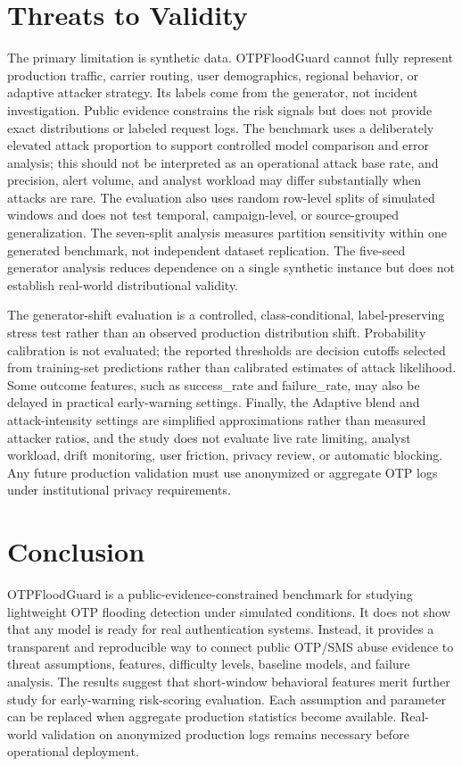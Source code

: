 \documentclass[conference]{IEEEtran}
\begin{document}
\section{Threats to Validity}

The primary limitation is synthetic data. OTPFloodGuard cannot fully represent production traffic, carrier routing, user demographics, regional behavior, or adaptive attacker strategy. Its labels come from the generator, not incident investigation. Public evidence constrains the risk signals but does not provide exact distributions or labeled request logs. The benchmark uses a deliberately elevated attack proportion to support controlled model comparison and error analysis; this should not be interpreted as an operational attack base rate, and precision, alert volume, and analyst workload may differ substantially when attacks are rare. The evaluation also uses random row-level splits of simulated windows and does not test temporal, campaign-level, or source-grouped generalization. The seven-split analysis measures partition sensitivity within one generated benchmark, not independent dataset replication. The five-seed generator analysis reduces dependence on a single synthetic instance but does not establish real-world distributional validity.

The generator-shift evaluation is a controlled, class-conditional, label-preserving stress test rather than an observed production distribution shift. Probability calibration is not evaluated; the reported thresholds are decision cutoffs selected from training-set predictions rather than calibrated estimates of attack likelihood. Some outcome features, such as success\_rate and failure\_rate, may also be delayed in practical early-warning settings. Finally, the Adaptive blend and attack-intensity settings are simplified approximations rather than measured attacker ratios, and the study does not evaluate live rate limiting, analyst workload, drift monitoring, user friction, privacy review, or automatic blocking. Any future production validation must use anonymized or aggregate OTP logs under institutional privacy requirements.

\section{Conclusion}

OTPFloodGuard is a public-evidence-constrained benchmark for studying lightweight OTP flooding detection under simulated conditions. It does not show that any model is ready for real authentication systems. Instead, it provides a transparent and reproducible way to connect public OTP/SMS abuse evidence to threat assumptions, features, difficulty levels, baseline models, and failure analysis. The results suggest that short-window behavioral features merit further study for early-warning risk-scoring evaluation. Each assumption and parameter can be replaced when aggregate production statistics become available. Real-world validation on anonymized production logs remains necessary before operational deployment.
\end{document}
